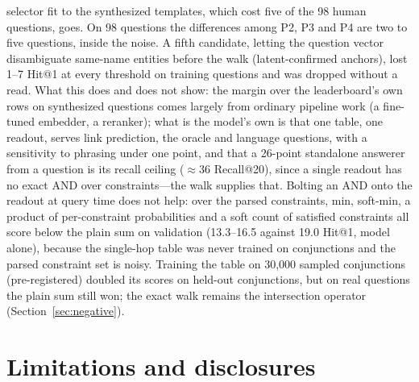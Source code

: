 \documentclass[11pt,a4paper]{article}
\begin{document}
selector fit to the synthesized templates, which cost five of the 98
human questions, goes. On 98 questions the differences among P2, P3 and
P4 are two to five questions, inside the noise. A fifth candidate,
letting the question vector disambiguate same-name entities before the
walk (latent-confirmed anchors), lost 1--7 Hit@1 at every threshold on
training questions and was dropped without a read. What this does and does not show:
the margin over the leaderboard's own rows on synthesized questions comes largely from
ordinary pipeline work (a fine-tuned embedder, a reranker); what is the
model's own is that one table, one readout, serves link prediction, the
oracle and language questions, with a sensitivity to phrasing under one
point, and that a 26-point standalone answerer from a question is its
recall ceiling ($\approx$36 Recall@20), since a single readout has no
exact AND over constraints---the walk supplies that. Bolting an AND onto
the readout at query time does not help: over the parsed constraints,
min, soft-min, a product of per-constraint probabilities and a soft
count of satisfied constraints all score below the plain sum on
validation (13.3--16.5 against 19.0 Hit@1, model alone), because the
single-hop table was never trained on conjunctions and the parsed
constraint set is noisy. Training the table on 30{,}000 sampled
conjunctions (pre-registered) doubled its scores on held-out
conjunctions, but on real questions the plain sum still won; the exact
walk remains the intersection operator (Section~\ref{sec:negative}).

\section{Limitations and disclosures}
\end{document}
